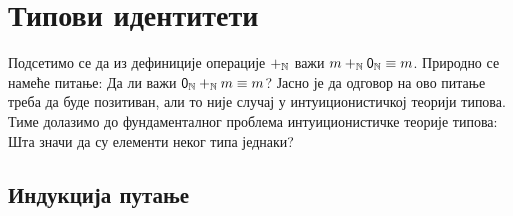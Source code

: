 \documentclass[12pt,oneside]{memoir}
\begin{document}
\section{Типови идентитети}

Подсетимо се да из дефиниције операције $+_\N$ важи $m +_\N \zeroN \equiv m$. Природно се намеће питање: Да ли важи $\zeroN +_\N m \equiv m$? Јасно је да одговор на ово питање треба да буде позитиван, али то није случај у интуиционистичкој теорији типова. Тиме долазимо до фундаменталног проблема интуиционистичке теорије типова: Шта значи да су елементи неког типа једнаки?

\begin{samepage}
    \begin{center}
        \begin{minipage}{0.49\textwidth}
            \begin{prooftree}[$=$-form]
            \end{prooftree}
        \end{minipage}
        \begin{minipage}{0.49\textwidth}
            \begin{prooftree}[$=$-intro]
            \end{prooftree}
        \end{minipage}
    \end{center}
\end{samepage}

\subsection{Индукција путање}
\end{document}
